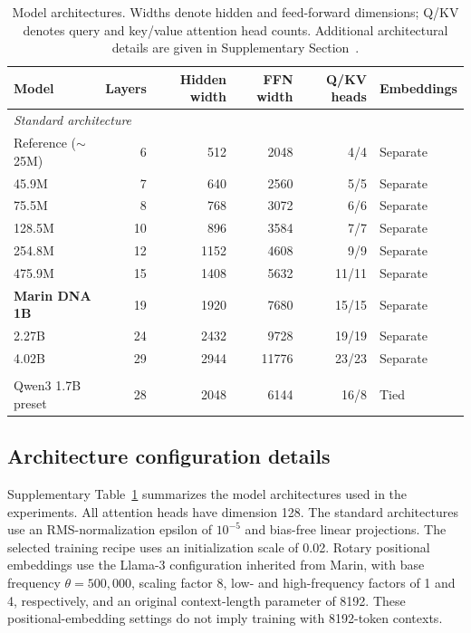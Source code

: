 \documentclass[a4paper,num-refs]{oup-contemporary}
\begin{document}
\setcounter{table}{0}
\renewcommand{\thetable}{S\arabic{table}}
\renewcommand{\theHtable}{supp.\arabic{table}}



\begin{table}[t]
\centering\small
\caption{Model architectures. Widths denote hidden and feed-forward
dimensions; Q/KV denotes query and key/value attention head counts.
Additional architectural details are given in
Supplementary Section~.}
\label{tab:architectures}
\begin{tabular}{lrrrrl}
\toprule
Model & Layers & Hidden width & FFN width & Q/KV heads & Embeddings \\
\midrule
\multicolumn{6}{l}{\emph{Standard architecture}} \\
Reference ($\sim$25M) & 6 & 512 & 2048 & 4/4 & Separate \\
45.9M & 7 & 640 & 2560 & 5/5 & Separate \\
75.5M & 8 & 768 & 3072 & 6/6 & Separate \\
128.5M & 10 & 896 & 3584 & 7/7 & Separate \\
254.8M & 12 & 1152 & 4608 & 9/9 & Separate \\
475.9M & 15 & 1408 & 5632 & 11/11 & Separate \\
\textbf{Marin DNA 1B} & 19 & 1920 & 7680 & 15/15 & Separate \\
2.27B & 24 & 2432 & 9728 & 19/19 & Separate \\
4.02B & 29 & 2944 & 11776 & 23/23 & Separate \\
\addlinespace
\multicolumn{6}{l}{\emph{Early exploratory architecture}} \\
Qwen3 1.7B preset & 28 & 2048 & 6144 & 16/8 & Tied \\
\bottomrule
\end{tabular}
\end{table}

\subsection{Architecture configuration details}
\label{supp:architecture-details}

Supplementary Table~\ref{tab:architectures} summarizes the model
architectures used in the experiments.
All attention heads have dimension 128.
The standard architectures use an RMS-normalization epsilon of
$10^{-5}$ and bias-free linear projections.
The selected training recipe uses an initialization scale of 0.02.
Rotary positional embeddings use the Llama-3 configuration inherited
from Marin, with base frequency $\theta=500{,}000$, scaling factor 8,
low- and high-frequency factors of 1 and 4, respectively, and an
original context-length parameter of 8192.
These positional-embedding settings do not imply training with
8192-token contexts.
\end{document}
